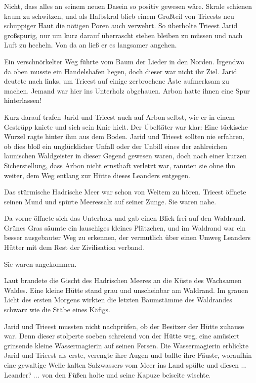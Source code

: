 Nicht, dass alles an seinem neuen Dasein so positiv gewesen wäre. Skrale schienen kaum zu schwitzen, und als Halbskral blieb einem Großteil von Trieests neu schuppiger Haut die nötigen Poren auch verwehrt. So überholte Trieest Jarid großspurig, nur um kurz darauf überrascht stehen bleiben zu müssen und nach Luft zu hecheln. Von da an ließ er es langsamer angehen.

Ein verschnörkelter Weg führte vom Baum der Lieder in den Norden. Irgendwo da oben musste ein Handelshafen liegen, doch dieser war nicht ihr Ziel. Jarid deutete nach links, um Trieest auf einige zerbrochene Äste aufmerksam zu machen. Jemand war hier ins Unterholz abgehauen. Arbon hatte ihnen eine Spur hinterlassen!

Kurz darauf trafen Jarid und Trieest auch auf Arbon selbst, wie er in einem Gestrüpp kniete und sich sein Knie hielt. Der Übeltäter war klar: Eine tückische Wurzel ragte hinter ihm aus dem Boden. Jarid und Trieest sollten nie erfahren, ob dies bloß ein unglücklicher Unfall oder der Unbill eines der zahlreichen launischen Waldgeister in dieser Gegend gewesen waren, doch nach einer kurzen Sicherstellung, dass Arbon nicht ernsthaft verletzt war, rannten sie ohne ihn weiter, dem Weg entlang zur Hütte dieses Leanders entgegen.\bigskip







Das stürmische Hadrische Meer war schon von Weitem zu hören. Trieest öffnete seinen Mund und spürte Meeressalz auf seiner Zunge. Sie waren nahe.

Da vorne öffnete sich das Unterholz und gab einen Blick frei auf den Waldrand. Grünes Gras säumte ein lauschiges kleines Plätzchen, und im Waldrand war ein besser ausgebauter Weg zu erkennen, der vermutlich über einen Umweg Leanders Hütter mit dem Rest der Zivilisation verband.

Sie waren angekommen.

Laut brandete die Gischt des Hadrischen Meeres an die Küste des Wachsamen Waldes. Eine kleine Hütte stand grau und unscheinbar am Waldrand. Im grauen Licht des ersten Morgens wirkten die letzten Baumstämme des Waldrandes schwarz wie die Stäbe eines Käfigs.

Jarid und Trieest mussten nicht nachprüfen, ob der Besitzer der Hütte zuhause war. Denn dieser stolperte soeben schreiend von der Hütte weg, eine amüsiert grinsende kleine Wassermagierin auf seinen Fersen. Die Wassermagierin erblickte Jarid und Trieest als erste, verengte ihre Augen und ballte ihre Fäuste, woraufhin eine gewaltige Welle kalten Salzwassers vom Meer ins Land spülte und diesen ... Leander? ... von den Füßen holte und seine Kapuze beiseite wischte.

